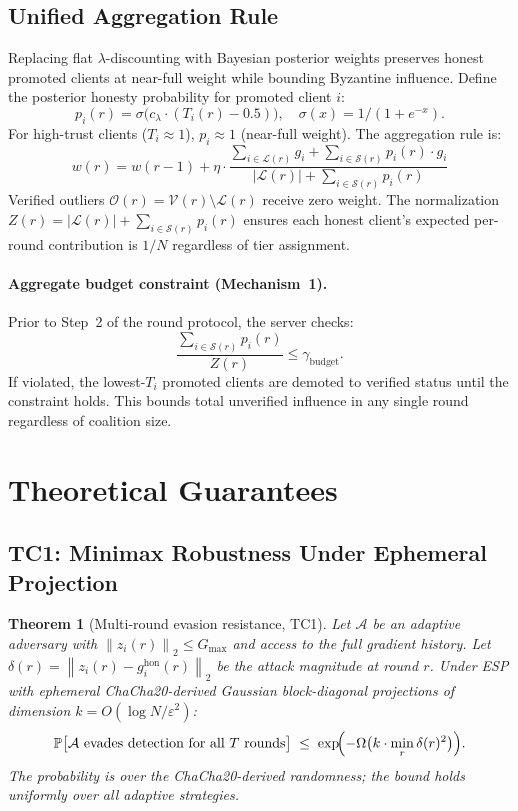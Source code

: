 \documentclass{article}
\newtheorem{theorem}{Theorem}
\renewcommand{\Pr}{\mathbb{P}}
\newcommand{\norm}[1]{\left\lVert #1 \right\rVert}
\newcommand{\calV}{\mathcal{V}}      %
\newcommand{\calS}{\mathcal{S}}      %
\newcommand{\calL}{\mathcal{L}}      %
\newcommand{\calO}{\mathcal{O}}      %
\newcommand{\ESP}{\textsc{ESP}}
\begin{document}
\subsection{Unified Aggregation Rule}
\label{sec:aggregation}

Replacing flat $\lambda$-discounting with Bayesian posterior weights
preserves honest promoted clients at near-full weight while bounding Byzantine
influence.
Define the posterior honesty probability for promoted client $i$:
\[
  p_i(r) = \sigma\!\bigl(c_\lambda \cdot (T_i(r) - 0.5)\bigr),
  \quad
  \sigma(x) = 1/(1 + e^{-x}).
\]
For high-trust clients ($T_i \approx 1$), $p_i \approx 1$ (near-full weight).
The aggregation rule is:
\[
  \boxed{
  w(r) = w(r{-}1) + \eta
  \cdot \frac{
    \sum_{i \in \calL(r)} g_i
    + \sum_{i \in \calS(r)} p_i(r) \cdot g_i
  }{
    |\calL(r)| + \sum_{i \in \calS(r)} p_i(r)
  }
  }
\]
Verified outliers $\calO(r) = \calV(r) \setminus \calL(r)$ receive zero
weight.
The normalization $Z(r) = |\calL(r)| + \sum_{i \in \calS(r)} p_i(r)$ ensures
each honest client's expected per-round contribution is $1/N$ regardless of
tier assignment.

\paragraph{Aggregate budget constraint (Mechanism~1).}
Prior to Step~2 of the round protocol, the server checks:
\[
  \frac{\sum_{i \in \calS(r)} p_i(r)}{Z(r)} \leq \gamma_{\mathrm{budget}}.
\]
If violated, the lowest-$T_i$ promoted clients are demoted to verified status
until the constraint holds.
This bounds total unverified influence in any single round regardless of
coalition size.

\section{Theoretical Guarantees}
\label{sec:theory}

\subsection{TC1: Minimax Robustness Under Ephemeral Projection}

\begin{theorem}[Multi-round evasion resistance, TC1]
\label{thm:robustness}
Let $\mathcal{A}$ be an adaptive adversary with $\norm{z_i(r)}_2 \leq G_{\max}$
and access to the full gradient history.
Let $\delta(r) = \norm{z_i(r) - g_i^{\mathrm{hon}}(r)}_2$ be the
attack magnitude at round $r$.
Under \ESP{} with ephemeral ChaCha20-derived Gaussian block-diagonal projections
of dimension $k = O(\log N / \varepsilon^2)$:
\[
  \Pr\bigl[\mathcal{A}\ \text{evades detection for all } T \text{ rounds}\bigr]
  \;\leq\;
  \exp\!\Bigl({-}\Omega\bigl(k \cdot \min_r \delta(r)^2\bigr)\Bigr).
\]
The probability is over the ChaCha20-derived randomness; the bound holds
uniformly over all adaptive strategies.
\end{theorem}
\end{document}
